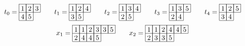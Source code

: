 \[
t_{0}=\begin{array}[c]{*{3}c}\cline{1-3}
\lr{1}&\lr{2}&\lr{3}\\\cline{1-3}
\lr{4}&\lr{5}\\\cline{1-2}
\end{array}
\hspace{20px}
t_{1}=\begin{array}[c]{*{3}c}\cline{1-3}
\lr{1}&\lr{2}&\lr{4}\\\cline{1-3}
\lr{3}&\lr{5}\\\cline{1-2}
\end{array}
\hspace{20px}
t_{2}=\begin{array}[c]{*{3}c}\cline{1-3}
\lr{1}&\lr{3}&\lr{4}\\\cline{1-3}
\lr{2}&\lr{5}\\\cline{1-2}
\end{array}
\hspace{20px}
t_{3}=\begin{array}[c]{*{3}c}\cline{1-3}
\lr{1}&\lr{3}&\lr{5}\\\cline{1-3}
\lr{2}&\lr{4}\\\cline{1-2}
\end{array}
\hspace{20px}
t_{4}=\begin{array}[c]{*{3}c}\cline{1-3}
\lr{1}&\lr{2}&\lr{5}\\\cline{1-3}
\lr{3}&\lr{4}\\\cline{1-2}
\end{array}
\]
\[
\hspace{20px}
x_{1}=\begin{array}[c]{*{6}c}\cline{1-6}
\lr{1}&\lr{1}&\lr{2}&\lr{3}&\lr{3}&\lr{5}\\\cline{1-6}
\lr{2}&\lr{4}&\lr{4}&\lr{5}\\\cline{1-4}
\end{array}
\hspace{20px}
x_{2}=\begin{array}[c]{*{6}c}\cline{1-6}
\lr{1}&\lr{1}&\lr{2}&\lr{4}&\lr{4}&\lr{5}\\\cline{1-6}
\lr{2}&\lr{3}&\lr{3}&\lr{5}\\\cline{1-4}
\end{array}
\hspace{20px}
\]
